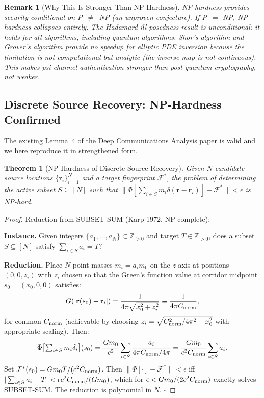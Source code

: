 \documentclass[aps,prd,twocolumn,superscriptaddress,nofootinbib]{revtex4-2}
\newcommand{\Fingerprint}{\mathcal{F}}
\newtheorem{theorem}{Theorem}
\newtheorem{remark}{Remark}
\begin{document}
\begin{remark}[Why This Is Stronger Than NP-Hardness]
\label{rem:stronger}
NP-hardness provides security conditional on P~$\neq$~NP (an unproven
conjecture). If P~$=$ NP, NP-hardness collapses entirely. The Hadamard
ill-posedness result is \emph{unconditional}: it holds for all algorithms,
including quantum algorithms. Shor's algorithm and Grover's algorithm
provide no speedup for elliptic PDE inversion because the limitation is
not computational but \emph{analytic} (the inverse map is not continuous).
This makes psi-channel authentication \emph{stronger} than post-quantum
cryptography, not weaker.
\end{remark}

\subsection{Discrete Source Recovery: NP-Hardness Confirmed}

The existing Lemma~4 of the Deep Communications Analysis paper is valid
and we here reproduce it in strengthened form.

\begin{theorem}[NP-Hardness of Discrete Source Recovery]
\label{thm:np-discrete}
Given $N$ candidate source locations $\{\mathbf{r}_i\}_{i=1}^N$ and
a target fingerprint $\Fingerprint^*$, the problem of determining the
active subset $S \subseteq [N]$ such that
$\|\Phi[\sum_{i \in S} m_i \delta(\mathbf{r}-\mathbf{r}_i)] - \Fingerprint^*\| < \epsilon$
is NP-hard.
\end{theorem}

\begin{proof}
Reduction from SUBSET-SUM (Karp 1972, NP-complete):

\textbf{Instance.} Given integers $\{a_1,\ldots,a_N\} \subset \mathbb{Z}_{>0}$
and target $T \in \mathbb{Z}_{>0}$, does a subset $S \subseteq [N]$
satisfy $\sum_{i\in S} a_i = T$?

\textbf{Reduction.} Place $N$ point masses $m_i = a_i m_0$ on the
$z$-axis at positions $(0, 0, z_i)$ with $z_i$ chosen so that
the Green's function value at corridor midpoint $s_0 = (x_0, 0, 0)$
satisfies:
\begin{equation}
G(|\mathbf{r}(s_0) - \mathbf{r}_i|) = \frac{1}{4\pi\sqrt{x_0^2 + z_i^2}}
\equiv \frac{1}{4\pi C_{\rm norm}},
\end{equation}
for common $C_{\rm norm}$ (achievable by choosing
$z_i = \sqrt{C_{\rm norm}^2/4\pi^2 - x_0^2}$ with appropriate scaling).
Then:
\begin{equation}
\Phi\!\left[\textstyle\sum_{i\in S} m_i \delta_i\right]\!(s_0)
= \frac{G m_0}{c^2}\sum_{i\in S}\frac{a_i}{4\pi C_{\rm norm}/4\pi}
= \frac{G m_0}{c^2 C_{\rm norm}}\sum_{i\in S} a_i.
\end{equation}
Set $\Fingerprint^*(s_0) = G m_0 T / (c^2 C_{\rm norm})$. Then
$\|\Phi[\cdot] - \Fingerprint^*\| < \epsilon$ iff
$|\sum_{i\in S} a_i - T| < \epsilon c^2 C_{\rm norm} / (G m_0)$,
which for $\epsilon < G m_0 / (2 c^2 C_{\rm norm})$ exactly solves
SUBSET-SUM. The reduction is polynomial in $N$. $\square$
\end{proof}
\end{document}
